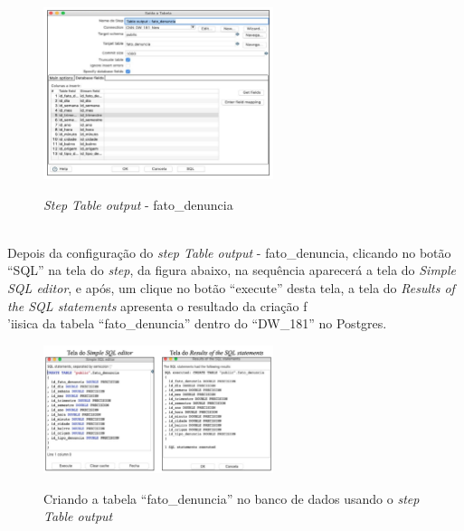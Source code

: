 \begin{figure}[H]
	\vspace*{0,2cm}
    \centering
    \caption{\textit{Step Table output} - fato\_denuncia}
    \includegraphics[width=0.6\textwidth]{./04-figuras/figura-step-to-fato-denuncia}
    \label{fig:ilustfigsteptofatodenuncia}
\end{figure}
\vspace*{-0,9cm}
{\raggedright {}} \\

Depois da configura\c{c}\~{a}o do \textit{step Table output} - fato\_denuncia, clicando no bot\~{a}o ``SQL'' na tela do \textit{step}, 
da figura abaixo, na sequência aparecer\'{a} a tela do \textit{Simple SQL editor}, e ap\'{o}s, um clique no bot\~{a}o ``execute'' 
desta tela, a tela do \textit{Results of the SQL statements} apresenta o resultado da cria\c{c}\~{a}o f\\'{i}{i}sica da tabela 
``fato\_denuncia'' dentro do ``DW\_181'' no Postgres. 

\begin{figure}[H]
	\vspace*{0,2cm}
    \centering
    \caption{Criando a tabela ``fato\_denuncia'' no banco de dados usando o \textit{step Table output}}
    \includegraphics[width=0.6\textwidth]{./04-figuras/figura-tb-fato-denuncia}
    \label{fig:ilustfigtbfatodenuncia}
\end{figure}
\vspace*{-0,9cm}
{\raggedright {}} \\

